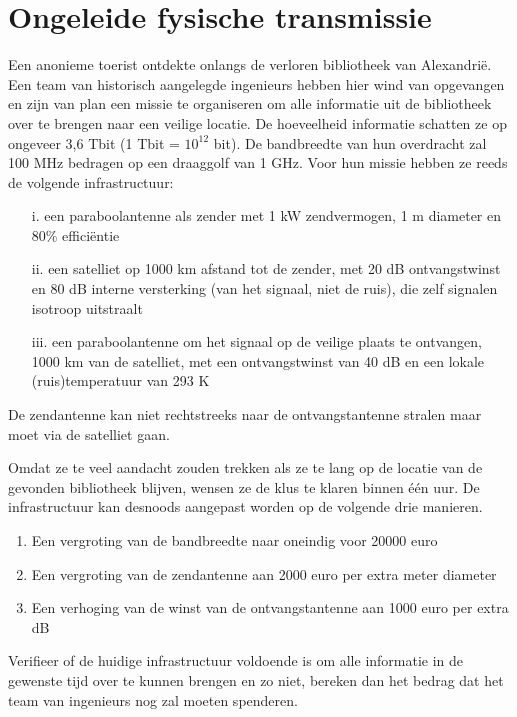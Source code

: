 \documentclass{kuburgiearticle}
\begin{document}
\newpage
	\section{Ongeleide fysische transmissie}

	Een anonieme toerist ontdekte onlangs de verloren bibliotheek van Alexandrië.
	Een team van historisch aangelegde ingenieurs hebben hier wind van opgevangen en zijn van plan een missie te organiseren om alle informatie uit de bibliotheek over te brengen naar een veilige locatie. De hoeveelheid informatie schatten ze op ongeveer 3,6 Tbit (1 Tbit = \(10^{12}\) bit). De bandbreedte van hun overdracht
	zal 100 MHz bedragen op een draaggolf van 1 GHz. Voor hun missie hebben ze reeds de volgende infrastructuur:\begin{enumerate}
		\item[i. ] een paraboolantenne als zender met 1 kW zendvermogen, 1 m diameter en 80\% efficiëntie
		\item[ii. ] een satelliet op 1000 km afstand tot de zender, met 20 dB ontvangstwinst en 80 dB interne versterking (van het signaal, niet de ruis), die zelf signalen isotroop uitstraalt
		\item[iii. ] een paraboolantenne om het signaal op de veilige plaats te ontvangen, 1000 km van de satelliet, met een ontvangstwinst van 40 dB en een lokale (ruis)temperatuur van 293 K	\end{enumerate}

	De zendantenne kan niet rechtstreeks naar de ontvangstantenne stralen maar moet via de satelliet gaan.

	Omdat ze te veel aandacht zouden trekken als ze te lang op de locatie van de gevonden bibliotheek blijven, wensen ze de klus te klaren binnen één uur. De infrastructuur kan desnoods aangepast worden op de volgende drie manieren. \begin{enumerate}
		\item Een vergroting van de bandbreedte naar oneindig voor 20000 euro
		\item Een vergroting van de zendantenne aan 2000 euro per extra meter diameter
		\item Een verhoging van de winst van de ontvangstantenne aan 1000 euro per extra dB
	\end{enumerate}

	Verifieer of de huidige infrastructuur voldoende is om alle informatie in de gewenste tijd over te kunnen brengen en zo niet, bereken dan het bedrag dat het team van ingenieurs nog zal moeten spenderen.
\end{document}
